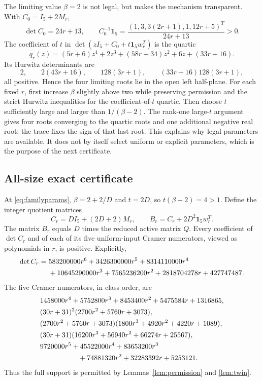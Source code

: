 \documentclass[11pt,a4paper]{article}
\theoremstyle{definition}\newtheorem{definition}[theorem]{Definition}
\theoremstyle{remark}\newtheorem{remark}[theorem]{Remark}
\newcommand{\ones}{\mathbf{1}}
\begin{document}
The limiting value $\beta=2$ is not legal, but makes the mechanism transparent. With $C_0=I_5+2M_r$,
\begin{equation}\label{eq:boundarypermission}
 \det C_0=24r+13,\qquad
 C_0^{-1}\ones_5=\frac{(1,3,3(2r+1),1,12r+5)^T}{24r+13}>0.
\end{equation}
The coefficient of $t$ in $\det(zI_5+C_0+t\ones_5w_r^T)$ is the quartic
\begin{equation}\label{eq:boundaryquartic}
 q_r(z)=(5r+6)z^4+2z^3+(58r+34)z^2+6z+(33r+16).
\end{equation}
Its Hurwitz determinants are
\[
 2,\qquad2(43r+16),\qquad128(3r+1),\qquad
 (33r+16)128(3r+1),
\]
all positive. Hence the four limiting roots lie in the open left half-plane. For each fixed $r$, first increase $\beta$ slightly above two while preserving permission and the strict Hurwitz inequalities for the coefficient-of-$t$ quartic. Then choose $t$ sufficiently large and larger than $1/(\beta-2)$. The rank-one large-$t$ argument gives four roots converging to the quartic roots and one additional negative real root; the trace fixes the sign of that last root. This explains why legal parameters are available. It does not by itself select uniform or explicit parameters, which is the purpose of the next certificate.

\subsection{All-size exact certificate}
At \eqref{eq:familyparams}, $\beta=2+2/D$ and $t=2D$, so
$t(\beta-2)=4>1$. Define the integer quotient matrices
\begin{equation}\label{eq:integerquotients}
 C_r=DI_5+(2D+2)M_r,\qquad
 B_r=C_r+2D^2\ones_5w_r^T.
\end{equation}
The matrix $B_r$ equals $D$ times the reduced active matrix $Q$.
Every coefficient of $\det C_r$ and of each of its five uniform-input Cramer numerators, viewed as polynomials in $r$, is positive. Explicitly,
\begin{align}\label{eq:familydet}
 \det C_r={}&583200000r^6+3426300000r^5+8314110000r^4\notag\\
 &+10645290000r^3+7565236200r^2+2818704278r+427747487.
\end{align}
The five Cramer numerators, in class order, are
\begin{align}\label{eq:familycramers}
 &1458000r^4+5752800r^3+8453400r^2+5475584r+1316865,\notag\\
 &(30r+31)^2(2700r^2+5760r+3073),\notag\\
 &(2700r^2+5760r+3073)(1800r^3+4920r^2+4220r+1089),\notag\\
 &(30r+31)(16200r^3+56940r^2+66274r+25567),\notag\\
 &9720000r^5+45522000r^4+83653200r^3\notag\\
 &\hspace{19mm}+74881320r^2+32283392r+5253121.
\end{align}
Thus the full support is permitted by Lemmas~\ref{lem:permission} and \ref{lem:twin}.
\end{document}
